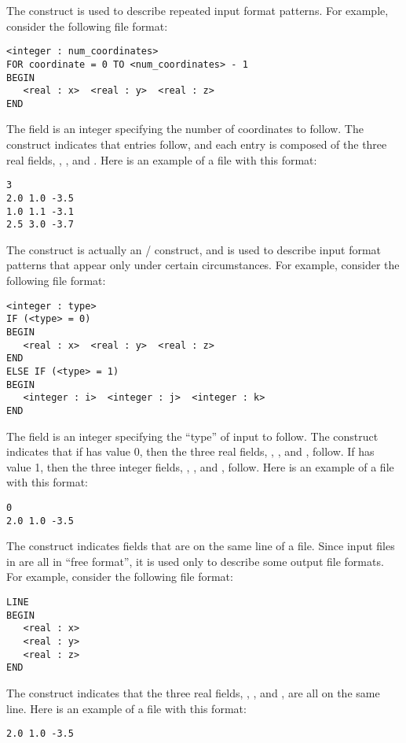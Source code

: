 The  construct is used to describe repeated input format patterns.
For example, consider the following file format:
\begin{display}\begin{verbatim}
<integer : num_coordinates>
FOR coordinate = 0 TO <num_coordinates> - 1
BEGIN
   <real : x>  <real : y>  <real : z>
END
\end{verbatim}\end{display}
The field  is an integer specifying the number
of coordinates to follow.
The  construct indicates that  entries
follow, and each entry is composed of the three real fields,
, , and .
Here is an example of a file with this format:
\begin{display}\begin{verbatim}
3
2.0 1.0 -3.5
1.0 1.1 -3.1
2.5 3.0 -3.7
\end{verbatim}\end{display}

The  construct is actually an / construct,
and is used to describe input format patterns that appear only under
certain circumstances.
For example, consider the following file format:
\begin{display}\begin{verbatim}
<integer : type>
IF (<type> = 0)
BEGIN
   <real : x>  <real : y>  <real : z>
END
ELSE IF (<type> = 1)
BEGIN
   <integer : i>  <integer : j>  <integer : k>
END
\end{verbatim}\end{display}
The field  is an integer specifying the ``type'' of
input to follow.
The  construct indicates that if  has value 0,
then the three real fields, , , and , follow.
If  has value 1, then the three integer fields,
, , and , follow.
Here is an example of a file with this format:
\begin{display}\begin{verbatim}
0
2.0 1.0 -3.5
\end{verbatim}\end{display}

The  construct indicates fields that are on the same line
of a file.
Since input files in \parflow{} are all in ``free format'', it is
used only to describe some output file formats.
For example, consider the following file format:
\begin{display}\begin{verbatim}
LINE
BEGIN
   <real : x>
   <real : y>
   <real : z>
END
\end{verbatim}\end{display}
The  construct indicates that the three real fields,
, , and , are all on the same line.
Here is an example of a file with this format:
\begin{display}\begin{verbatim}
2.0 1.0 -3.5
\end{verbatim}\end{display}

